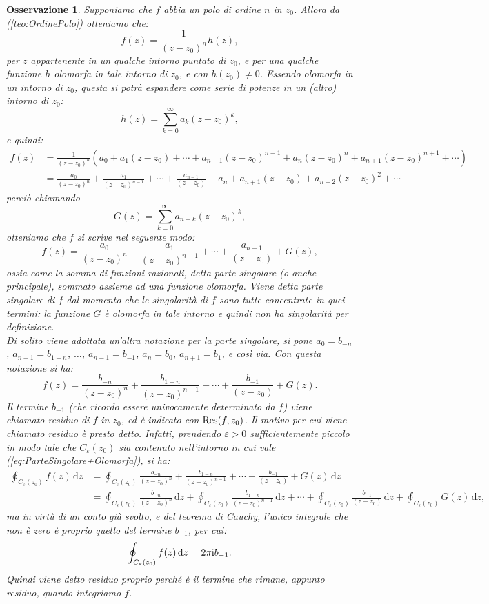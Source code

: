 \documentclass[11pt]{book}
\theoremstyle{Definizione}
\theoremstyle{TeoremaProposizioneLemmaCorollarioCongettura}
\theoremstyle{OsservazioneNotaEsempio}
\newtheorem{myobs}{Osservazione}[section]
\renewcommand{\i}{\textup{i}}
\renewcommand{\d}{\mathrm{d}}
\newcommand{\dz}{\,\d z}
\newcommand{\Res}{\textup{Res}}
\begin{document}
\begin{myobs}
Supponiamo che $f$ abbia un polo di ordine $n$ in $z_0$. Allora da (\ref{teo:OrdinePolo}) otteniamo che:
$$
f(z) = \frac{1}{(z-z_0)^n}h(z),
$$
per $z$ appartenente in un qualche intorno puntato di $z_0$, e per una qualche funzione $h$ olomorfa in tale intorno di $z_0$, e con $h(z_0) \neq 0$. Essendo olomorfa in un intorno di $z_0$, questa si potrà espandere come serie di potenze in un (altro) intorno di $z_0$:
$$
h(z) = \sum_{k = 0}^\infty a_k (z-z_0)^k,
$$
e quindi:
\begin{align*}
f(z) &= \frac{1}{(z-z_0)^n}\left(a_0 + a_1 (z-z_0) + \cdots + a_{n-1}(z-z_0)^{n-1}+a_{n}(z-z_0)^n+a_{n+1}(z-z_0)^{n+1}+\cdots\right)\\
&= \frac{a_0}{(z-z_0)^n}+\frac{a_1}{(z-z_0)^{n-1}}+\cdots+\frac{a_{n-1}}{(z-z_0)} + a_n + a_{n+1}(z-z_0) + a_{n+2}(z-z_0)^2+\cdots
\end{align*}
perciò chiamando
$$
G(z) = \sum_{k = 0}^\infty a_{n+k}(z-z_0)^k,
$$
otteniamo che $f$ si scrive nel seguente modo:
$$
f(z) = \frac{a_0}{(z-z_0)^n}+\frac{a_1}{(z-z_0)^{n-1}}+\cdots+\frac{a_{n-1}}{(z-z_0)} + G(z),
$$
ossia come la somma di funzioni razionali, detta parte singolare (o anche principale), sommato assieme ad una funzione olomorfa. Viene detta parte singolare di $f$ dal momento che le singolarità di $f$ sono tutte concentrate in quei termini: la funzione $G$ è olomorfa in tale intorno e quindi non ha singolarità per definizione.\\
Di solito viene adottata un'altra notazione per la parte singolare, si pone $a_0 = b_{-n}$, $a_{n-1} = b_{1-n}$, $\dots$, $a_{n-1} = b_{-1}$,  $a_n = b_0$, $a_{n+1} = b_1$, e così via. Con questa notazione si ha:
\begin{equation}\label{eq:ParteSingolare+Olomorfa}
f(z) = \frac{b_{-n}}{(z-z_0)^n}+\frac{b_{1-n}}{(z-z_0)^{n-1}} + \cdots + \frac{b_{-1}}{(z-z_0)}+ G(z).
\end{equation}
Il termine $b_{-1}$ (che ricordo essere univocamente determinato da $f$) viene chiamato residuo di $f$ in $z_0$, ed è indicato con $\Res(f,z_0)$. Il motivo per cui viene chiamato residuo è presto detto. Infatti, prendendo $\varepsilon > 0$ sufficientemente piccolo in modo tale che $C_\varepsilon(z_0)$ sia contenuto nell'intorno in cui vale (\ref{eq:ParteSingolare+Olomorfa}), si ha:
\begin{align*}
\oint_{C_\varepsilon(z_0)} f(z) \dz &= \oint_{C_\varepsilon(z_0)} \frac{b_{-n}}{(z-z_0)^n}+\frac{b_{1-n}}{(z-z_0)^{n-1}} + \cdots + \frac{b_{-1}}{(z-z_0)}+ G(z)\dz\\
&= \oint_{C_\varepsilon(z_0)} \frac{b_{-n}}{(z-z_0)^n}\dz+\oint_{C_\varepsilon(z_0)} \frac{b_{1-n}}{(z-z_0)^{n-1}}\dz+\cdots+\oint_{C_\varepsilon(z_0)} \frac{b_{-1}}{(z-z_0)} \dz+\oint_{C_\varepsilon(z_0)} G(z)\dz,
\end{align*}
ma in virtù di un conto già svolto, e del teorema di Cauchy, l'unico integrale che non è zero è proprio quello del termine $b_{-1}$, per cui:
$$
\oint_{C_\varepsilon(z_0)} f(z)\dz = 2\pi\i b_{-1}.
$$
Quindi viene detto residuo proprio perché è il termine che rimane, appunto residuo, quando integriamo $f$.
\end{myobs}
\end{document}
